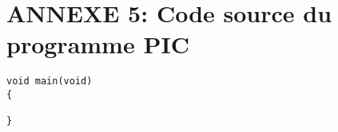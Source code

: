 \section{ANNEXE 5: Code source du programme PIC}
\begin{lstlisting}
void main(void)
{

}
\end{lstlisting}